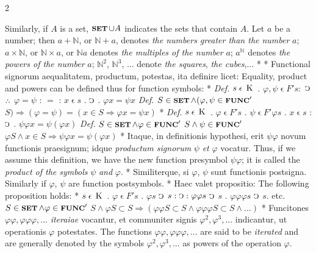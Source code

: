 \documentclass{book}
\newcommand{\C}{\mathop{\sbox0{$\displaystyle$$\reflectbox{C}$} %
\raisebox{-\height+\ht0-0.05cm}[\ht0][\dp0]{\scalebox{0.8}[0.8]{\copy0}}}\displaylimits} %
\newcommand{\pppNoSpace}{\leavevmode\lower0ex\hbox{.}\kern-0.1em\raise0.7ex\hbox{.}\kern-0.1em\lower0ex\hbox{.}} %
\newcommand{\smallIn}{\ensuremath{\mathrel{\epsilon}}}
\newcommand{\K}{\mathop{\thinspace \text{K} \thinspace}}
\newcommand{\setOfSets}{\mathop{\text{{\footnotesize \textbf{SET}}}}}
\newcommand{\func}{\mathord{\text{{\footnotesize \textbf{FUNC}}}}}
\renewcommand{\rightarrow}{\Rightarrow}
\newenvironment{translateTwoCol}
               { %
                 \columnratio{0.5, 0.5}
                 \begin{paracol}{2}
                 \newcommand{\LAT}{\switchcolumn[0]*}
                 \newcommand{\ENG}{\switchcolumn[1]}
               }
               { %
                 \let\ENG\undefined
                 \let\LAT\undefined
                 \end{paracol}
               }
\begin{document}
\begin{translateTwoCol}
\ENG
Similarly, if $A$ is a set, $\setOfSets \cup A$ indicates the sets that contain $A$. Let $a$ be a number; then $a + \mathbb{N}$, or $\mathbb{N} + a$, denotes \emph{the numbers greater than the number} $a$; $a \times \mathbb{N}$, or $\mathbb{N} \times a$, or $\mathbb{N} a$ denotes \emph{the multiples of the number} $a$; $a^\mathbb{N}$ denotes \emph{the powers of the number} $a$; $\mathbb{N}^2$, $\mathbb{N}^3$, ... denote \emph{the squares}, \emph{the cubes},...
\LAT
\hfill
\ENG
\hfill
\LAT
Functional signorum aequalitatem, productum, potestas, ita definire licet:
\ENG
Equality, product and powers can be defined thus for function symbols:
\LAT
\emph{Def.} \hspace{0.25cm} $s \smallIn \K$ . $\varphi, \psi \smallIn F' s :$ $\C$ $\pppNoSpace$ $\varphi = \psi$ : $=$ : $x \smallIn s$ . $\C$ . $\varphi x = \psi x$
\ENG
\emph{Def.} \hspace{0.25cm} $S \in \setOfSets \wedge (\varphi, \psi \in \func'$ $S) \rightarrow (\varphi = \psi) = (x \in S \rightarrow \varphi x = \psi x)$
\LAT
\emph{Def.} \hspace{0.25cm} $s \smallIn \K$ . $\varphi \smallIn F' s$ $.$ $\psi \smallIn F' \varphi s$ . $x \smallIn s$ : $\C$ . $\psi \varphi x = \psi (\varphi x)$
\ENG
\emph{Def.} \hspace{0.25cm} $S \in \setOfSets \wedge \varphi \in \func'$ $S \wedge \psi \in \func'$ $\varphi S \wedge x \in S \rightarrow \psi \varphi x = \psi (\varphi x)$
\LAT
Itaque, in definitionis hypothesi, erit $\psi \varphi$ novum functionis praesignum; idque \emph{productum signorum} $\psi$ \emph{et} $\varphi$ vocatur.
\ENG
Thus, if we assume this definition, we have the new function presymbol $\psi \varphi$; it is called the \emph{product of the symbols} $\psi$ \emph{and} $\varphi$.
\LAT
Similiterque, si $\varphi$, $\psi$ sunt functionis postsigna.
\ENG
Similarly if $\varphi$, $\psi$ are function postsymbols.
\LAT
Haec valet propositio:
\ENG
The following proposition holds:
\LAT
\hspace{1.06cm} $s \smallIn \K$ . $\varphi \smallIn F' s$ . $\varphi s$ $\C$ $s : \C : \varphi \varphi s$ $\C$ $s$ . $\varphi \varphi \varphi s$ $\C$ $s$. etc.
\ENG
\hspace{1.06cm} $S \in \setOfSets \wedge \varphi\in \func'$ $S \wedge \varphi S \subset S \rightarrow (\varphi \varphi S \subset S \wedge \varphi \varphi \varphi S \subset S \wedge \ldots)$ 
\LAT
Funcitones $\varphi \varphi, \varphi \varphi \varphi,...$ \emph{iteraiae} vocantur, et communiter signis $\varphi^2, \varphi^3,...$ indicantur, ut operationis $\varphi$ potestates.
\ENG
The functions $\varphi \varphi, \varphi \varphi \varphi,...$ are said to be \emph{iterated} and are generally denoted by the symbols $\varphi^2, \varphi^3,...$ as powers of the operation $\varphi$.
\end{translateTwoCol}
\end{document}

